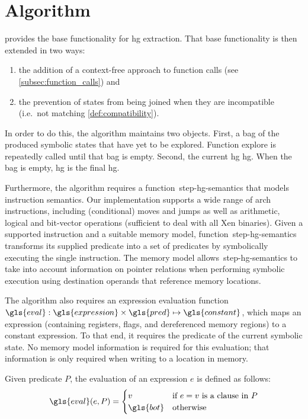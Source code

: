 \section{Algorithm}
 provides the base functionality for \ac{hg} extraction.
That base functionality is then extended in two ways:
\begin{enumerate}
  \item the addition of a context-free approach to function calls (see \cref{subsec:function_calls}) and
  \item the prevention of states from being joined when they are incompatible (i.e.\ not matching \cref{def:compatibility}). 
\end{enumerate}
In order to do this, the algorithm maintains two objects.
First, a \gls{bag} of the produced symbolic states that have yet to be explored.
Function \gls{explore} is repeatedly called until that \gls{bag} is empty.
Second, the current \ac{hg} \gls{hg}.
When the \gls{bag} is empty, \gls{hg} is the final \ac{hg}.

Furthermore, the algorithm requires a function~\gls{step-hg-semantics} that models instruction semantics.
Our implementation supports a wide range of \gls{arch} instructions,
including (conditional) moves and jumps as well as
arithmetic, logical and bit-vector operations (sufficient to deal with all Xen binaries).
Given a supported instruction and a suitable memory model,
function~\gls{step-hg-semantics} transforms its supplied predicate
into a set of predicates 
by symbolically executing the single instruction.
The memory model allows~\gls{step-hg-semantics} to take into account information on pointer relations
when performing symbolic execution using destination operands
that reference memory locations.


The algorithm also requires an expression evaluation function
$\gls{eval}:\gls{expression}\times\gls{pred}\mapsto\gls{constant}$,
which maps an expression (containing registers, flags, and dereferenced memory regions)
to a constant expression.
To that end, it requires the predicate of the current symbolic state.
No memory model information is required for this evaluation;
that information is only required when writing to a location in memory.
\begin{definition}\label{def:eval}
  Given predicate $P$,  the evaluation of an expression $e$ is defined as follows:
  \begin{equation*}
    \gls{eval}(e,P)=\begin{cases}
      v & \text{if $e = v$ is a clause in }P \\
      \gls{bot} & \text{otherwise}
    \end{cases}
  \end{equation*}
\end{definition}

